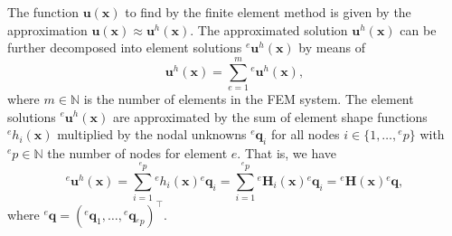 \documentclass[a4paper,11pt]{article}
\numberwithin{equation}{section}
\newcommand\matr[1]{\ensuremath{\boldsymbol{\mathbf{#1}}}}
\newcommand\vect[1]{\ensuremath{\bm{#1}}}
\begin{document}
{The function $\vect{u}(\vect{x})$ to find by the finite element method is given by the approximation $\vect{u}(\vect{x}) \approx \vect{u}^h(\vect{x})$. The approximated solution $\vect{u}^h(\vect{x})$ can be further decomposed into element solutions ${}^e \vect{u}^h(\vect{x})$ by means of \begin{equation}
	\vect{u}^h(\vect{x}) = \sum_{e=1}^{m}{}^e \vect{u}^h(\vect{x}),
\end{equation} where $m \in \mathbb{N}$ is the number of elements in the FEM system. The element solutions ${}^e\vect{u}^h(\vect{x})$ are approximated by the sum of element shape functions ${}^e h_i(\vect{x})$ multiplied by the nodal unknowns ${}^e \vect{q}_i$ for all nodes $i \in \{1,\dots,{}^e p\}$ with ${}^e p \in \mathbb{N}$ the number of nodes for element $e$. That is, we have \begin{equation}
{}^e \vect{u}^h(\vect{x}) = \sum_{i=1}^{{}^e p}{}^e h_i(\vect{x}){}^e\vect{q}_i = \sum_{i=1}^{{}^e p} {}^e \matr{H}_i(\vect{x}) {}^e \vect{q}_i = {}^e \matr{H}(\vect{x}){}^e \vect{q},
\end{equation} where ${}^e \vect{q} = ({}^e \vect{q}_1, \dots, {}^e \vect{q}_{{}^e p})^\top$.
}
\end{document}
